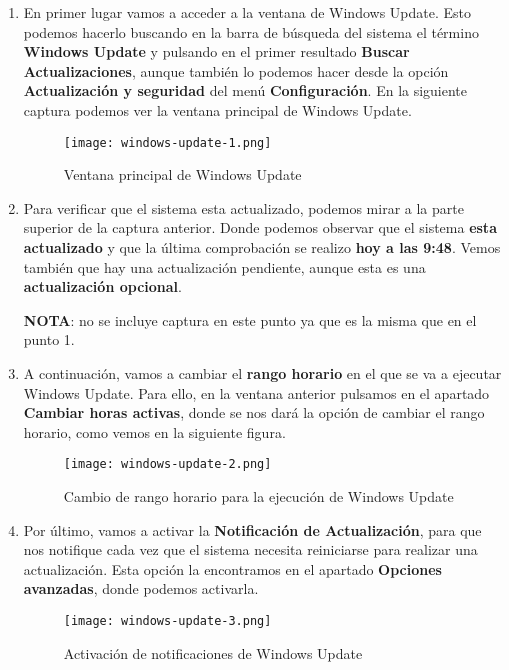 \begin{enumerate}
    \item En primer lugar vamos a acceder a la ventana de Windows Update. Esto podemos hacerlo buscando en la barra de búsqueda del sistema el término \textbf{Windows Update} y pulsando en el primer resultado \textbf{Buscar Actualizaciones}, aunque también lo podemos hacer desde la opción \textbf{Actualización y seguridad} del menú \textbf{Configuración}. En la siguiente captura podemos ver la ventana principal de Windows Update.

     \begin{figure}[H]
        \centering
        \texttt{[image: windows-update-1.png]}
        \caption{Ventana principal de Windows Update}
    \end{figure}

    \item Para verificar que el sistema esta actualizado, podemos mirar a la parte superior de la captura anterior. Donde podemos observar que el sistema \textbf{esta actualizado} y que la última comprobación se realizo \textbf{hoy a las 9:48}. Vemos también que hay una actualización pendiente, aunque esta es una \textbf{actualización opcional}.

    \textbf{NOTA}: no se incluye captura en este punto ya que es la misma que en el punto 1.

    \item A continuación, vamos a cambiar el \textbf{rango horario }en el que se va a ejecutar Windows Update. Para ello, en la ventana anterior pulsamos en el apartado \textbf{Cambiar horas activas}, donde se nos dará la opción de cambiar el rango horario, como vemos en la siguiente figura.

    \begin{figure}[H]
        \centering
        \texttt{[image: windows-update-2.png]}
        \caption{Cambio de rango horario para la ejecución de Windows Update}
    \end{figure}

    \item Por último, vamos a activar la \textbf{Notificación de Actualización}, para que nos notifique cada vez que el sistema necesita reiniciarse para realizar una actualización. Esta opción la encontramos en el apartado \textbf{Opciones avanzadas}, donde podemos activarla.

    \begin{figure}[H]
        \centering
        \texttt{[image: windows-update-3.png]}
        \caption{Activación de notificaciones de Windows Update}
    \end{figure}
\end{enumerate}

